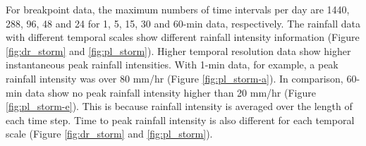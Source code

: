 For breakpoint data, the maximum numbers of time intervals per day are 1440,
288, 96, 48 and 24 for 1, 5, 15, 30 and 60-min data, respectively. The rainfall
data with different temporal scales show different rainfall intensity
information (Figure \ref{fig:dr_storm} and \ref{fig:pl_storm}). Higher temporal
resolution data show higher instantaneous peak rainfall intensities. With 1-min
data, for example, a peak rainfall intensity was over 80 mm/hr (Figure
\ref{fig:pl_storm-a}). In comparison, 60-min data show no peak rainfall
intensity higher than 20 mm/hr (Figure \ref{fig:pl_storm-e}). This is because
rainfall intensity is averaged over the length of each time step. Time to peak
rainfall intensity is also different for each temporal scale (Figure
\ref{fig:dr_storm} and \ref{fig:pl_storm}).

\begin{figure}[htbp]
  \centering
    \qquad

\end{figure}
